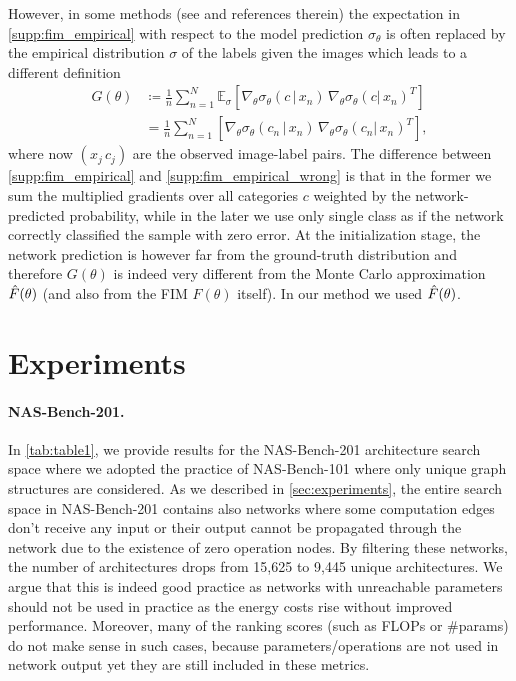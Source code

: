 However, in some methods (see \cite{kunstner2019limitations} and references therein) the expectation in \eqref{supp:fim_empirical} with respect to the model prediction $\sigma_\theta$ is often replaced by the empirical distribution $\sigma$ of the labels given the images which leads to a different definition
\begin{align}
G(\theta)&\coloneq\frac{1}{n}\sum_{n=1}^N\mathbb{E}_{\sigma}\left[\nabla_{\theta}\sigma_\theta(c\,|\,x_n)\,\nabla_{\theta}\sigma_\theta(c|\,x_n)^T\right]\nonumber\\
&=\frac{1}{n}\sum_{n=1}^N\left[\nabla_{\theta}\sigma_\theta(c_n\,|\,x_n)\,\nabla_{\theta}\sigma_\theta(c_n|\,x_n)^T\right],
    \label{supp:fim_empirical_wrong}
\end{align}
where now $(x_j\,c_j)$ are the observed image-label pairs. The difference between \eqref{supp:fim_empirical} and \eqref{supp:fim_empirical_wrong} is that in the former we sum the multiplied gradients over all categories $c$ weighted by the network-predicted probability, while in the later we use only single class as if the network correctly classified the sample with zero error. At the initialization stage, the network prediction is however far from the ground-truth distribution and therefore $G(\theta)$ is indeed very different from the Monte Carlo approximation $\Hat{F}(\theta)$ (and also from the FIM $F(\theta)$ itself). In our method we used $\Hat{F}(\theta)$.

\section{Experiments}



\paragraph{NAS-Bench-201.}

In \cref{tab:table1}, we provide results for the NAS-Bench-201 architecture search space where we adopted the practice of NAS-Bench-101 \cite{ying2019bench, kadlecova2024surprisingly, mehrotra2021bench} where only unique graph structures are considered. As we described in  \cref{sec:experiments}, the entire search space in NAS-Bench-201 contains also networks where some computation edges don't receive any input or their output cannot be propagated through the network due to the existence of zero operation nodes. By filtering these networks, the number of architectures drops from 15,625 to 9,445 unique architectures. We argue that this is indeed good practice as networks with unreachable parameters should not be used in practice as the energy costs rise without improved performance. Moreover, many of the ranking scores (such as FLOPs or \#params) do not make sense in such cases, because parameters/operations are not used in network output yet they are still included in these metrics. 

